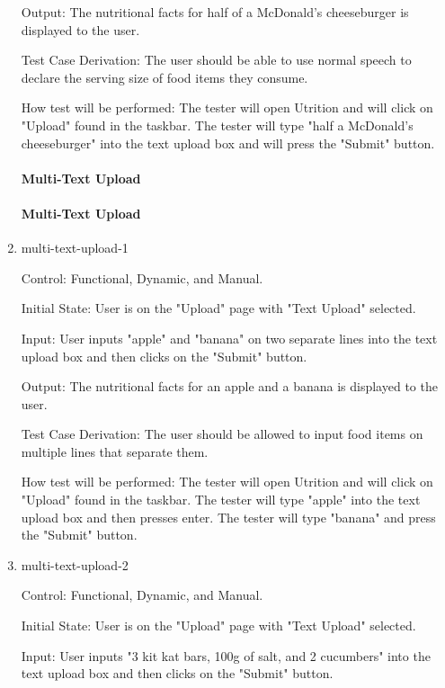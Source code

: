 \documentclass[12pt, titlepage]{article}
\begin{document}
\begin{enumerate}
	Output: The nutritional facts for half of a McDonald's cheeseburger is displayed to the user.
	
	Test Case Derivation: The user should be able to use normal speech to declare the serving size of food items they consume.
	
	How test will be performed: The tester will open Utrition and will click on "Upload" found in the taskbar. The tester will type "half a McDonald's cheeseburger" into the text upload box and will press the "Submit" button.
	
	\paragraph{Multi-Text Upload}
	\paragraph{Multi-Text Upload}
	
	\item{multi-text-upload-1\\}
	
	Control: Functional, Dynamic, and Manual.
	
	Initial State: User is on the "Upload" page with "Text Upload" selected.
	
	Input: User inputs "apple" and "banana" on two separate lines into the text upload box and then clicks on the "Submit" button.
	
	Output: The nutritional facts for an apple and a banana is displayed to the user.
	
	Test Case Derivation: The user should be allowed to input food items on multiple lines that separate them.
	
	How test will be performed: The tester will open Utrition and will click on "Upload" found in the taskbar. The tester will type "apple" into the text upload box and then presses enter. The tester will type "banana" and press the "Submit" button.
	
	\item{multi-text-upload-2\\}
	
	Control: Functional, Dynamic, and Manual.
	
	Initial State: User is on the "Upload" page with "Text Upload" selected.
	
	Input: User inputs "3 kit kat bars, 100g of salt, and 2 cucumbers" into the text upload box and then clicks on the "Submit" button.
	

\end{enumerate}
\end{document}

